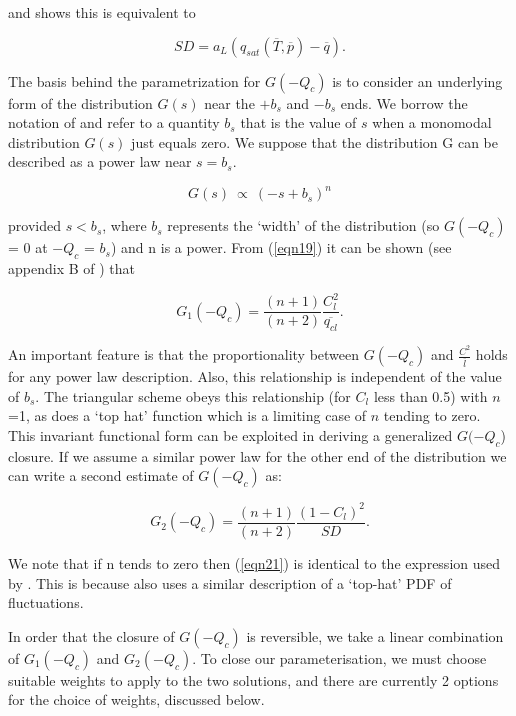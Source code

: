 \documentclass{UMDP_article}
\begin{document}
and shows this is equivalent to

\begin{equation}
{SD = a_L  ( q_{sat}({\overline{T}},{\overline{p}}) - {\overline{q}} ) .}
\label{SD2}
\end{equation}

The basis behind the parametrization for $G(-Q_c)$ is to consider
an underlying form of the distribution $G(s)$ near the $+b_s$ and
$-b_s$ ends. We borrow the notation of \cite{smith90} and refer
to a quantity $b_s$ that is the value of $s$ when a monomodal
distribution $G(s)$ just equals zero. We suppose that the
distribution G can be described as a power law near $s=b_s$.

\begin{equation}
G(s) ~ \propto ~ {(-s + b_s)}^n 
\label{eqn19}
\end{equation}

provided $s<b_s$, where $b_s$ represents the `width' of the
distribution (so $G(-Q_c)$ = 0
at $-Q_c$ = $b_s$) and n is a power. From (\ref{eqn19}) it can be
shown (see appendix B of \cite{wg03}) that 

\begin{equation}
{G_1(-Q_c) = {\frac{(n+1)}{(n+2)}} {\frac{C_l^2}{\overline{q_{cl}}}} .}
\label{eqn20}
\end{equation} 

An important feature is that the proportionality between $G(-Q_c)$ and
${\frac{C^2}{\overline{l}} }$
holds for any power law description.  Also, this relationship is independent of
the value of $b_s$. The triangular \cite{smith90} scheme obeys this relationship (for
$C_l$ less than 0.5) with $n$=1, as does a `top hat' function which is a
limiting case of $n$
tending to zero. This invariant functional form can be exploited in deriving a
generalized $G(-Q_c$) closure. If we assume a similar power law for
the other end of the distribution we can write a second estimate of
$G(-Q_c)$ as: 

\begin{equation}
{G_2(-Q_c) = {\frac{(n+1)}{(n+2)}} {\frac{{(1-C_l)}^2}{SD}} .}
\label{eqn21}
\end{equation}

We note that if n tends to zero then (\ref{eqn21}) is identical to
the expression used by \cite{jgt99}. This is because
\cite{jgt99} 
also uses a similar description of a `top-hat' PDF of fluctuations.

In order that the closure of $G(-Q_c)$ is reversible, we take a linear
combination of $G_1(-Q_c)$ and $G_2(-Q_c)$.
To close our parameterisation, we must choose suitable weights to apply
to the two solutions, and there are currently 2 options for the choice
of weights, discussed below.
\end{document}
